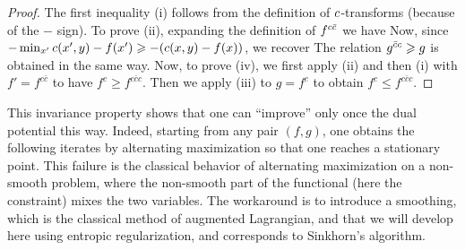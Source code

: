\begin{proof} The first inequality (i) follows from the definition of $c$-transforms (because of the $-$ sign). To prove (ii), expanding the definition of $f^{c\bar{c}}$ we have
Now, since $-\min_{x'} c(x',y) - f(x') \geqslant -(c(x,y)-f(x))$, we recover 
The relation $g^{\bar{c}c} \geqslant g$ is obtained in the same way. 
%
Now, to prove (iv), we first apply (ii) and then (i) with $f'=f^{c\bar c}$ to have $f^c \geq f^{c \bar c c}$.
Then we apply (iii) to $g=f^c$ to obtain $f^c \leq f^{c\bar c c}$. 
\end{proof}

This invariance property shows that one can ``improve'' only once the dual potential this way. Indeed, starting from any pair $(f,g)$, one obtains the following iterates by alternating maximization
so that one reaches a stationary point. 
%
This failure is the classical behavior of alternating maximization on a non-smooth problem, where the non-smooth part of the functional (here the constraint) mixes the two variables. 
% 
The workaround is to introduce a smoothing, which is the classical method of augmented Lagrangian, and that we will develop here using entropic regularization, and corresponds to Sinkhorn's algorithm. 



  
  